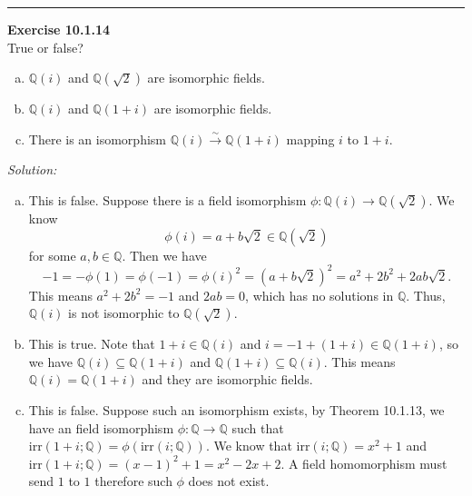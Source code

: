 \documentclass[a4paper, 12pt]{article}
\newenvironment{problem}[2][Exercise]
    { \begin{mdframed}[backgroundcolor=gray!20] \textbf{#1 #2} \\}
    {  \end{mdframed}}
\newenvironment{solution}
    {\textit{Solution:}}
    {}
\newcommand{\irr}{\text{irr}}
\begin{document}
\noindent\rule{7in}{2.8pt}
\begin{problem}{10.1.14}
True or false?
\begin{enumerate}[(a)]
\item \(\mathbb{Q}(i)\) and \(\mathbb{Q}(\sqrt{2})\) are isomorphic fields. 
\item \(\mathbb{Q}(i)\) and \(\mathbb{Q}(1+i)\) are isomorphic fields. 
\item There is an isomorphism \(\mathbb{Q}(i)\xrightarrow{\sim} \mathbb{Q}(1+i)\) mapping \(i\) to \(1+i\).
\end{enumerate}
\end{problem}
\begin{solution}
\begin{enumerate}[(a)]
\item This is false. Suppose there is a field isomorphism \(\phi:\mathbb{Q}(i)\rightarrow \mathbb{Q}(\sqrt{2})\). We know 
\[\phi(i)=a+b\sqrt{2}\in \mathbb{Q}(\sqrt{2})\]
for some \(a,b\in \mathbb{Q}\). Then we have 
\[-1=-\phi(1)=\phi(-1)=\phi(i)^2=(a+b\sqrt{2})^2=a^2+2b^2+2ab\sqrt{2}.\]
This means \(a^2+2b^2=-1\) and \(2ab=0\), which has no solutions in \(\mathbb{Q}\). Thus, \(\mathbb{Q}(i)\) is not isomorphic to \(\mathbb{Q}(\sqrt{2})\). 
\item This is true. Note that \(1+i\in \mathbb{Q}(i)\) and \(i=-1+(1+i)\in \mathbb{Q}(1+i)\), so we have \(\mathbb{Q}(i)\subseteq \mathbb{Q}(1+i)\) and 
\(\mathbb{Q}(1+i)\subseteq \mathbb{Q}(i)\). This means \(\mathbb{Q}(i)=\mathbb{Q}(1+i)\) and they are isomorphic fields.
\item This is false. Suppose such an isomorphism exists, by Theorem 10.1.13, we have an field isomorphism \(\phi:\mathbb{Q}\rightarrow \mathbb{Q}\) such that \(\irr(1+i;\mathbb{Q})=\phi(\irr(i;\mathbb{Q}))\). We know that 
\(\irr(i;\mathbb{Q})=x^2+1\) and \(\irr(1+i;\mathbb{Q})=(x-1)^2+1=x^2-2x+2\). A field homomorphism must send \(1\) to \(1\) therefore such \(\phi\) does not exist. 
\end{enumerate}
\end{solution}
\end{document}
